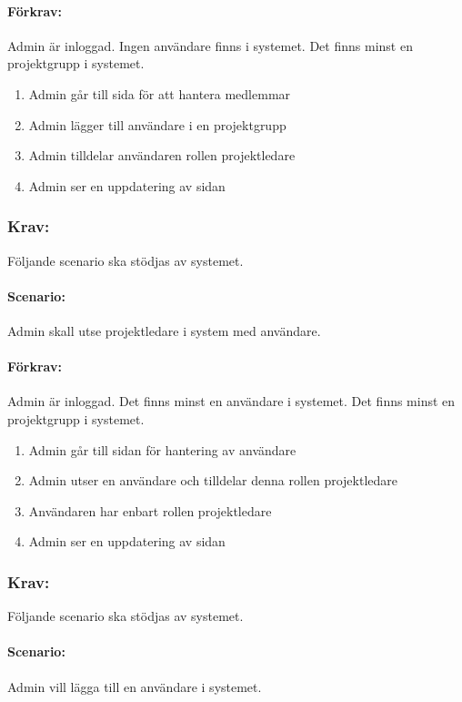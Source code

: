 \documentclass[paper=a4, fontsize=11pt,twoside]{article}
\begin{document}
\paragraph{Förkrav:}
Admin är inloggad. Ingen användare finns i systemet. Det finns minst en projektgrupp i systemet.
\begin{enumerate}
\item Admin går till sida för att hantera medlemmar
\item Admin lägger till användare i en projektgrupp
\item Admin tilldelar användaren rollen projektledare
\item Admin ser en uppdatering av sidan
\end{enumerate}

\subsubsection{Krav:} Följande scenario ska stödjas av systemet. 
\paragraph{Scenario:}
Admin skall utse projektledare i system med användare.
\paragraph{Förkrav:}
Admin är inloggad. Det finns minst en användare i systemet. Det finns minst en projektgrupp i systemet.
\begin{enumerate}
\item Admin går till sidan för hantering av användare
\item Admin utser en användare och tilldelar denna rollen projektledare
\item Användaren har enbart rollen projektledare
\item Admin ser en uppdatering av sidan
\end{enumerate}

\subsubsection{Krav:} Följande scenario ska stödjas av systemet. 
\paragraph{Scenario:}
Admin vill lägga till en användare i systemet.
\end{document}
